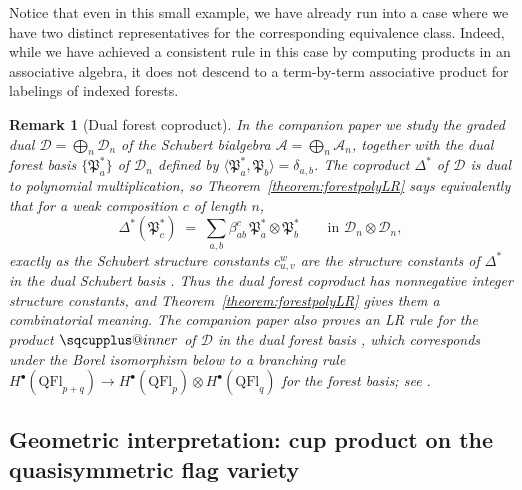 \documentclass[pdflatex,sn-mathphys-num]{sn-jnl}
\makeatletter
\newcommand{\sqcupplus@inner}[2]{%
  \vcenter{\hbox{\ooalign{%
    \hfil$\m@th#1\sqcup$\hfil\cr
    \hfil\raisebox{0.15ex}{$\m@th#1\scriptscriptstyle+$}\hfil\cr
  }}}%
}
\newcommand{\sqcupplus}{\mathbin{\mathpalette\sqcupplus@inner\relax}}
\numberwithin{equation}{subsection}
\newcommand{\coma}{\mathcal{A}}
\newcommand{\dcoma}{\mathcal{D}}
\newcommand{\forest}{\mathfrak{P}}
\theoremstyle{thmstyleone}
\theoremstyle{thmstylethree}
\theoremstyle{thmstyletwo}
\newtheorem*{remark}{Remark}
\makeatother
\begin{document}
Notice that even in this small example, we have already run into a case where we have two distinct representatives for the corresponding equivalence class. Indeed, while we have achieved a consistent rule in this case by computing products in an associative algebra, it does not descend to a term-by-term associative product for labelings of indexed forests.


\begin{remark}[Dual forest coproduct]
In the companion paper \cite{samuelbialgebra} we study the graded dual $\dcoma=\bigoplus_n\dcoma_n$ of the Schubert bialgebra $\coma=\bigoplus_n\coma_n$, together with the \emph{dual forest basis} $\{\forest_a^*\}$ of $\dcoma_n$ defined by $\langle\forest_a^*,\forest_b\rangle=\delta_{a,b}$. The coproduct $\Delta^*$ of $\dcoma$ is dual to polynomial multiplication, so Theorem~\ref{theorem:forestpolyLR} says equivalently that for a weak composition $c$ of length $n$,
$$\Delta^*(\forest_c^*) \;=\; \sum_{a,b}\beta_{ab}^c\,\forest_a^*\otimes\forest_b^*\qquad\text{in }\dcoma_n\otimes\dcoma_n,$$
exactly as the Schubert structure constants $c_{u,v}^w$ are the structure constants of $\Delta^*$ in the dual Schubert basis \cite[Theorem~\ref*{B-theorem:dschcoproduct}]{samuelbialgebra}. Thus the dual forest coproduct has nonnegative integer structure constants, and Theorem~\ref{theorem:forestpolyLR} gives them a combinatorial meaning. The companion paper also proves an LR rule for the \emph{product} $\sqcupplus$ of $\dcoma$ in the dual forest basis \cite[Theorem~\ref*{B-theorem:LRforest}]{samuelbialgebra}, which corresponds under the Borel isomorphism below to a branching rule $H^\bullet(\mathrm{QFl}_{p+q})\to H^\bullet(\mathrm{QFl}_p)\otimes H^\bullet(\mathrm{QFl}_q)$ for the forest basis; see \cite[\S\ref*{B-subsection:qflbranch}]{samuelbialgebra}.
\end{remark}



\subsection{Geometric interpretation: cup product on the quasisymmetric flag variety}\label{subsection:qflbranch}
\end{document}
